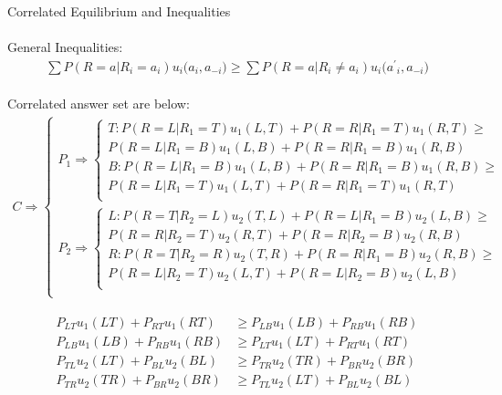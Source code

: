 \documentclass[
  course = {{IE579 Game Theory and Multi-Agent Reinforcement Learning}},
  quartile = {{4}},
  assignment = 2,
  name = {{Mohammad Mahdi Rahimi}},
  studentnumber = {{20208244}},
  email = {{mahi@kaist.ac.kr}},
  firstexercise = 1
]{aga-homework}
\begin{document}
\subexercise Correlated Equilibrium and Inequalities
\\\\
General Inequalities:\\ 
\begin{equation} \label{eq1}
\begin{split}
\sum{P(R = a | R_i  = a_i) u_i(a_i, a_{-i}}) \ge \sum{P(R = a | R_i  \neq a_i) u_i({a^\prime}_i, a_{-i}})
\end{split}
\end{equation}
\\
Correlated answer set are below:\\ 
\begin{equation}
    \begin{split}
    C \Rightarrow \begin{cases}
    P_1 \Rightarrow 
     \begin{cases}
            T: P(R = L | R_1  = T) u_1(L, T) + P(R = R | R_1  = T) u_1(R, T) \ge\\
            P(R = L | R_1 = B) u_1(L, B) + P(R = R | R_1  = B) u_1(R, B)\\
            B: P(R = L | R_1  = B) u_1(L, B) + P(R = R | R_1  = B) u_1(R, B) \ge\\
            P(R = L | R_1 = T) u_1(L, T) + P(R = R | R_1  = T) u_1(R, T)\\
     \end{cases}\\
    P_2 \Rightarrow 
     \begin{cases}
            L: P(R = T | R_2  = L) u_2(T, L) + P(R = L | R_1  = B) u_2(L, B) \ge\\
            P(R = R | R_2 = T) u_2(R, T) + P(R = R | R_2  = B) u_2(R, B)\\
            R: P(R = T | R_2  = R) u_2(T, R) + P(R = R | R_1  = B) u_2(R, B) \ge\\
            P(R = L | R_2 = T) u_2(L, T) + P(R = L | R_2  = B) u_2(L, B)\\
     \end{cases}\\
    \end{cases}
    \end{split}
\end{equation}

\begin{equation}
    \begin{split}
    P_{LT}u_1(LT) + P_{RT}u_1(RT) & \ge P_{LB}u_1(LB) + P_{RB}u_1(RB) \\
    P_{LB}u_1(LB) + P_{RB}u_1(RB) & \ge P_{LT}u_1(LT) + P_{RT}u_1(RT) \\
    P_{TL}u_2(LT) + P_{BL}u_2(BL) & \ge P_{TR}u_2(TR) + P_{BR}u_2(BR) \\
    P_{TR}u_2(TR) + P_{BR}u_2(BR) & \ge P_{TL}u_2(LT) + P_{BL}u_2(BL)
    \end{split}
\end{equation}
\end{document}
